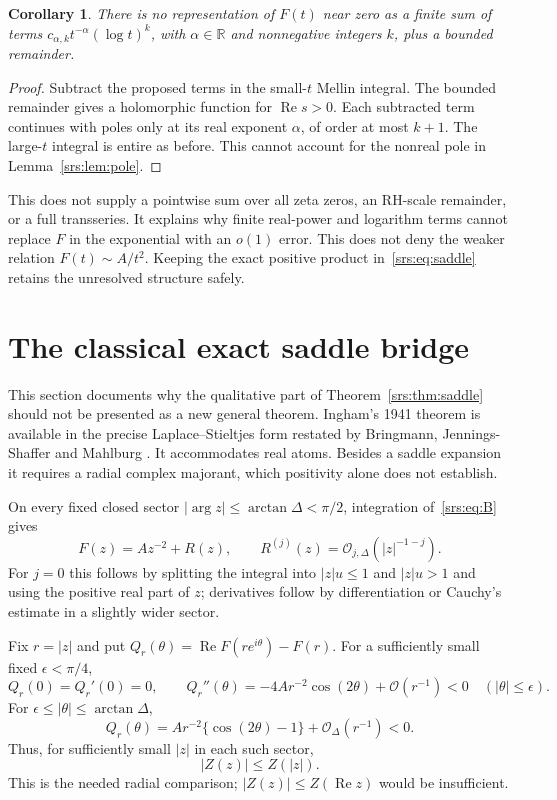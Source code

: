 \documentclass[11pt]{article}
\numberwithin{equation}{section}
\newtheorem{corollary}[theorem]{Corollary}
\theoremstyle{remark}\newtheorem{remark}[theorem]{Remark}
\newcommand{\Oh}{\mathcal O}
\newcommand{\R}{\mathbb R}
\DeclareMathOperator{\Ree}{Re}
\begin{document}
\begin{corollary}\label{srs:cor:finiteexpansion}
There is no representation of $F(t)$ near zero as a finite sum of terms
$c_{\alpha,k}t^{-\alpha}(\log t)^k$, with $\alpha\in\R$ and nonnegative integers $k$, plus a bounded remainder.
\end{corollary}
\begin{proof}
Subtract the proposed terms in the small-$t$ Mellin integral. The bounded remainder gives a holomorphic function for $\Ree s>0$. Each subtracted term continues with poles only at its real exponent $\alpha$, of order at most $k+1$. The large-$t$ integral is entire as before. This cannot account for the nonreal pole in Lemma~\ref{srs:lem:pole}.
\end{proof}
This does not supply a pointwise sum over all zeta zeros, an RH-scale remainder, or a full transseries. It explains why finite real-power and logarithm terms cannot replace $F$ in the exponential with an $o(1)$ error. This does not deny the weaker relation $F(t)\sim A/t^2$. Keeping the exact positive product in~\eqref{srs:eq:saddle} retains the unresolved structure safely.

\section{The classical exact saddle bridge}\label{srs:sec:classical}
This section documents why the qualitative part of Theorem~\ref{srs:thm:saddle} should not be presented as a new general theorem. Ingham's 1941 theorem is available in the precise Laplace--Stieltjes form restated by Bringmann, Jennings-Shaffer and Mahlburg \cite[Theorem 4.1]{BJM}. It accommodates real atoms. Besides a saddle expansion it requires a radial complex majorant, which positivity alone does not establish.

On every fixed closed sector $|\arg z|\le\arctan\Delta<\pi/2$, integration of~\eqref{srs:eq:B} gives
\begin{equation}
 F(z)=Az^{-2}+R(z),\qquad
 R^{(j)}(z)=\Oh_{j,\Delta}(|z|^{-1-j}).\label{srs:eq:sector}
\end{equation}
For $j=0$ this follows by splitting the integral into $|z|u\le1$ and $|z|u>1$ and using the positive real part of $z$; derivatives follow by differentiation or Cauchy's estimate in a slightly wider sector.

Fix $r=|z|$ and put $Q_r(\theta)=\Ree F(re^{i\theta})-F(r)$. For a sufficiently small fixed $\epsilon<\pi/4$,
\begin{equation}
 Q_r(0)=Q_r'(0)=0,\qquad
 Q_r''(\theta)=-4Ar^{-2}\cos(2\theta)+\Oh(r^{-1})<0
 \quad(|\theta|\le\epsilon).
\end{equation}
For $\epsilon\le|\theta|\le\arctan\Delta$,
\[
 Q_r(\theta)=Ar^{-2}\{\cos(2\theta)-1\}+\Oh_\Delta(r^{-1})<0.
\]
Thus, for sufficiently small $|z|$ in each such sector,
\begin{equation}
 |Z(z)|\le Z(|z|).\label{srs:eq:radial}
\end{equation}
This is the needed radial comparison; $|Z(z)|\le Z(\Ree z)$ would be insufficient.
\end{document}
